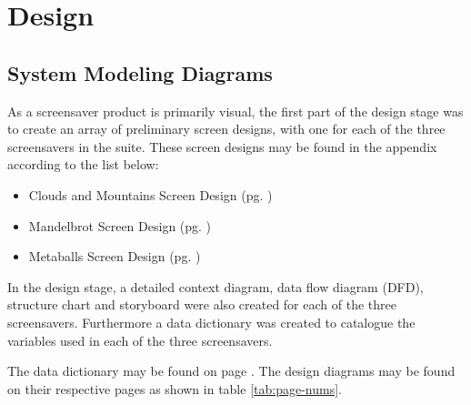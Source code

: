 \documentclass[10pt, openany]{book}
\begin{document}
\chapter{Design}

\section{System Modeling Diagrams}
As a screensaver product is primarily visual, the first part of the design stage was to create an array of preliminary screen designs, with one for each of the three screensavers in the suite.
These screen designs may be found in the appendix according to the list below:
\begin{itemize}
	\item Clouds and Mountains Screen Design (pg. \pageref{app:clouds-screen})
	\item Mandelbrot Screen Design (pg. \pageref{app:mandelbrot-screen})
	\item Metaballs Screen Design (pg. \pageref{app:metaballs-screen})
\end{itemize}

In the design stage, a detailed context diagram, data flow diagram (DFD), structure chart and storyboard were also created for each of the three screensavers. Furthermore a data dictionary was created to catalogue the variables used in each of the three screensavers.

The data dictionary may be found on page \pageref{app:data-dictionary}.
The design diagrams may be found on their respective pages as shown in table \ref{tab:page-nums}.
\end{document}
